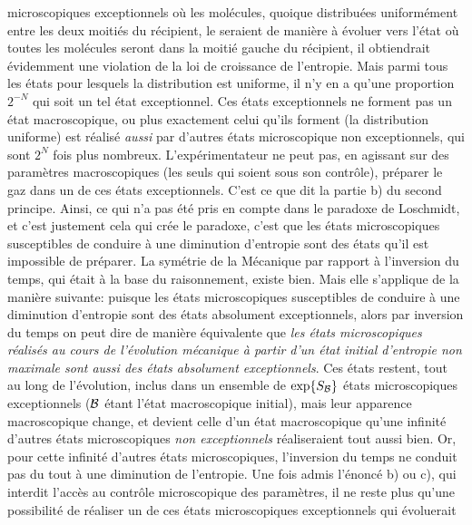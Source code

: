 microscopiques exceptionnels o\`u les mol\'ecules, quoique distribu\'ees 
uniform\'ement entre les deux moiti\'es du r\'ecipient, le seraient 
de mani\`ere \`a \'evoluer vers l'\'etat o\`u toutes les mol\'ecules 
seront dans la moiti\'e gauche du r\'ecipient, il obtiendrait \'evidemment 
une vio\-la\-tion de la loi de croissance de l'entropie.  Mais parmi tous
les \'etats pour lesquels la distribution est uniforme, il n'y en a qu'une  
proportion $2^{-N}$ qui soit un tel \'etat exceptionnel.  Ces \'etats 
exceptionnels ne forment pas un \'etat macroscopique, ou plus exactement 
celui qu'ils forment (la distribution uniforme) est r\'ealis\'e {\it aussi} 
par d'autres \'etats microscopique non exceptionnels, qui sont $2^N$ fois 
plus nombreux. 
L'exp\'erimentateur ne peut pas, en agissant sur des param\`etres 
macroscopiques (les seuls qui soient sous son contr\^ole), pr\'eparer le 
gaz dans un de ces \'etats exceptionnels. C'est ce que dit la partie 
b) du second principe. 
\medskip
Ainsi, ce qui n'a pas \'et\'e pris en compte dans le paradoxe de Loschmidt,
et c'est justement cela qui cr\'ee le paradoxe, c'est que les \'etats 
microscopiques susceptibles de conduire \`a une diminution d'entropie 
sont des \'etats qu'il est impossible de pr\'eparer. La sym\'etrie de la 
M\'ecanique par rapport \`a l'inversion du temps, qui \'etait \`a la 
base du raisonnement,  exis\-te bien.  Mais elle s'applique de la mani\`ere 
suivante:  puisque les \'etats microscopiques susceptibles de conduire \`a 
une diminution d'entropie sont des \'etats absolument exceptionnels, 
alors par inversion du temps on peut dire de mani\`ere \'equivalente que 
{\sl les \'etats microscopiques r\'ealis\'es au cours de l'\'evolution 
m\'ecanique \`a partir d'un \'etat initial d'entropie non maximale sont 
aussi des \'etats absolument exceptionnels}.  Ces \'etats restent, 
tout au long de l'\'evolution,  inclus dans un ensemble de 
$\exp\{ S_{\cal B}\}$ \'etats microscopiques exceptionnels
(${\cal B}$ \'etant l'\'etat macroscopique initial), mais leur apparence 
macroscopique change, et devient celle d'un \'etat macroscopique qu'une 
infinit\'e d'autres \'etats microscopiques {\it non exceptionnels} 
r\'ealiseraient tout aussi bien.  Or, pour cette infinit\'e d'autres 
\'etats microscopiques, l'inversion du temps ne conduit pas du tout \`a 
une diminution de l'entropie. 
\medskip
Une fois admis l'\'enonc\'e b) ou c), qui interdit l'acc\`es au contr\^ole 
microscopique des param\`etres, il ne reste plus qu'une possibilit\'e de 
r\'ealiser un de ces \'etats microscopiques exceptionnels qui \'evoluerait 
